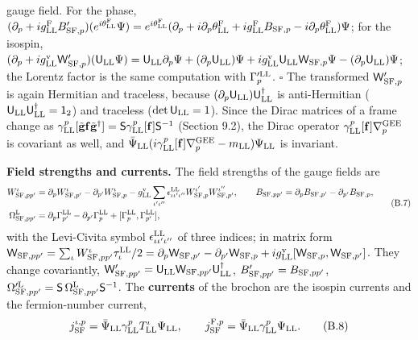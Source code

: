 \documentclass[
  10pt,
]{article}
\begin{document}
gauge field. For the phase,
\((\partial_p+ig^{\rm F}_{\rm LL}B'_{{\rm SF},p})(e^{i\theta^{\rm F}_{\rm LL}}\Psi)=e^{i\theta^{\rm F}_{\rm LL}}(\partial_p+i\partial_p\theta^{\rm F}_{\rm LL}+ig^{\rm F}_{\rm LL}B_{{\rm SF},p}-i\partial_p\theta^{\rm F}_{\rm LL})\Psi\);
for the isospin,
\((\partial_p+ig^{\rm v}_{\rm LL}\mathsf W'_{{\rm SF},p})(\mathsf U_{\rm LL}\Psi)=\mathsf U_{\rm LL}\partial_p\Psi+(\partial_p\mathsf U_{\rm LL})\Psi+ig^{\rm v}_{\rm LL}\mathsf U_{\rm LL}\mathsf W_{{\rm SF},p}\Psi-(\partial_p\mathsf U_{\rm LL})\Psi\);
the Lorentz factor is the same computation with \(\Gamma'^{\rm LL}_p\).
\(\square\) The transformed \(\mathsf W'_{{\rm SF},p}\) is again
Hermitian and traceless, because
\((\partial_p\mathsf U_{\rm LL})\mathsf U_{\rm LL}^\dagger\) is
anti-Hermitian
(\(\mathsf U_{\rm LL}\mathsf U_{\rm LL}^\dagger=\mathsf 1_2\)) and
traceless (\(\det\mathsf U_{\rm LL}=1\)). Since the Dirac matrices of a
frame change as
\(\gamma^p_{\rm LL}[\tilde{\mathbf g}\mathbf f\tilde{\mathbf g}^\dagger]=\mathsf S\gamma^p_{\rm LL}[\mathbf f]\mathsf S^{-1}\)
(Section 9.2), the Dirac operator
\(\gamma^p_{\rm LL}[\mathbf f]\nabla^{\rm GEE}_p\) is covariant as well,
and
\(\bar\Psi_{\rm LL}(i\gamma^p_{\rm LL}[\mathbf f]\nabla^{\rm GEE}_p-m_{\rm LL})\Psi_{\rm LL}\)
is invariant.

\textbf{Field strengths and currents.} The field strengths of the gauge
fields are
\[\begin{aligned}W^\iota_{{\rm SF},pp'}&=\partial_pW^\iota_{{\rm SF},p'}-\partial_{p'}W^\iota_{{\rm SF},p}-g^{\rm v}_{\rm LL}\sum_{\iota'\iota''}\epsilon^{\rm LL}_{\iota\iota'\iota''}W^{\iota'}_{{\rm SF},p}W^{\iota''}_{{\rm SF},p'},\qquad B_{{\rm SF},pp'}=\partial_pB_{{\rm SF},p'}-\partial_{p'}B_{{\rm SF},p},\\\Omega^{\rm L}_{{\rm SF},pp'}&=\partial_p\Gamma^{\rm LL}_{p'}-\partial_{p'}\Gamma^{\rm LL}_p+[\Gamma^{\rm LL}_p,\Gamma^{\rm LL}_{p'}],\end{aligned}\tag{B.7}\]
with the Levi-Civita symbol \(\epsilon^{\rm LL}_{\iota\iota'\iota''}\)
of three indices; in matrix form
\(\mathsf W_{{\rm SF},pp'}=\sum_\iota W^\iota_{{\rm SF},pp'}\tau^{\rm LL}_\iota/2=\partial_p\mathsf W_{{\rm SF},p'}-\partial_{p'}\mathsf W_{{\rm SF},p}+ig^{\rm v}_{\rm LL}[\mathsf W_{{\rm SF},p},\mathsf W_{{\rm SF},p'}]\).
They change covariantly,
\(\mathsf W'_{{\rm SF},pp'}=\mathsf U_{\rm LL}\mathsf W_{{\rm SF},pp'}\mathsf U_{\rm LL}^\dagger\),
\(B'_{{\rm SF},pp'}=B_{{\rm SF},pp'}\),
\(\Omega'^{\rm L}_{{\rm SF},pp'}=\mathsf S\,\Omega^{\rm L}_{{\rm SF},pp'}\mathsf S^{-1}\).
The \textbf{currents} of the brochon are the isospin currents and the
fermion-number current,
\[j^{\iota,p}_{\rm SF}=\bar\Psi_{\rm LL}\gamma^p_{\rm LL}T^\iota_{\rm LL}\Psi_{\rm LL},\qquad j^{{\rm F},p}_{\rm SF}=\bar\Psi_{\rm LL}\gamma^p_{\rm LL}\Psi_{\rm LL}.\tag{B.8}\]
\end{document}
